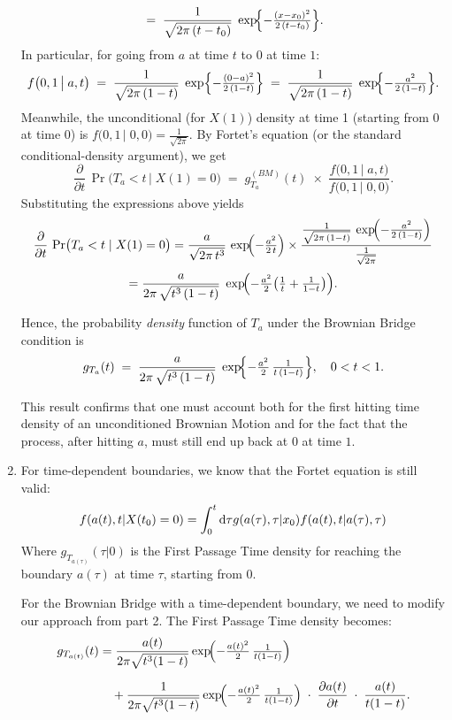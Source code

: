 \documentclass[12pt]{article}
\begin{document}
\begin{enumerate}
\[		\;=\;
		\frac{1}{\sqrt{2\pi\,(t-t_0)}} \;
		\exp\!\Bigl\{-\tfrac{(x - x_0)^{2}}{2\,(t-t_0)}\Bigr\}.
		\]
		In particular, for going from $a$ at time $t$ to $0$ at time $1$:
		\[
		f\bigl(0,1 \,\big|\; a,t\bigr)
		\;=\;
		\frac{1}{\sqrt{2\pi\,(1-t)}}\;
		\exp\Bigl\{-\tfrac{(0 - a)^2}{2\,(1-t)}\Bigr\}
		\;=\;
		\frac{1}{\sqrt{2\pi\,(1-t)}}\;
		\exp\!\Bigl\{-\tfrac{a^{2}}{2\,(1-t)}\Bigr\}.
		\]
		Meanwhile, the unconditional (for $X(1)$) density at time 1 (starting from 0 at time 0) is $f\bigl(0,1 \,\big|\; 0,0\bigr) = \tfrac{1}{\sqrt{2\pi}}$.
		By Fortet’s equation (or the standard conditional-density argument), we get
		\[
		\frac{\partial}{\partial t}\,\Pr\!\bigl(T_a < t \,\big|\; X(1)=0\bigr)
		\;=\;
		g_{T_a}^{(BM)}(t)
		\;\times\;
		\frac{f\bigl(0,1 \,\big|\; a,t\bigr)}{f\bigl(0,1 \,\big|\; 0,0\bigr)}.
		\]
		Substituting the expressions above yields
		\[
		\frac{\partial}{\partial t}\,\Pr\bigl(T_a < t \mid X(1)=0\bigr)
		= \frac{a}{\sqrt{2\pi\,t^{3}}}\,\exp\!\Bigl(-\tfrac{a^{2}}{2\,t}\Bigr)
		\times \frac{\tfrac{1}{\sqrt{2\pi\,(1-t)}}\,\exp\!\Bigl(-\tfrac{a^{2}}{2\,(1-t)}\Bigr)}
		{\tfrac{1}{\sqrt{2\pi}}}
		\]
		\[
		= \frac{a}{2\pi\,\sqrt{t^{3}\,(1-t)}}\;
		\exp\!\Bigl(-\tfrac{a^{2}}{2}\bigl(\tfrac{1}{t}+\tfrac{1}{1-t}\bigr)\Bigr).
		\]
		
		Hence, the probability \textit{density} function of $T_a$ under the Brownian Bridge condition is
		\[
		g_{T_a}(t)
		\;=\;
		\frac{a}{2\pi\,\sqrt{t^{3}\,(1-t)}}\;
		\exp\!\Bigl\{-\tfrac{a^{2}}{2}\,\tfrac{1}{t\,(1-t)}\Bigr\},
		\quad 0 < t < 1.
		\]
		
		\noindent
		This result confirms that one must account both for the first hitting time density of an unconditioned Brownian Motion and for the fact that the process, after hitting $a$, must still end up back at $0$ at time $1$.
		
		\item For time-dependent boundaries, we know that the Fortet equation is still valid:
		\begin{equation*}
			f(a(t),t|X(t_{0})=0)=\int_{0}^{t}\mathop{}\!\mathrm{d}\tau g(a(\tau),\tau|x_{0})f(a(t),t|a(\tau),\tau)
		\end{equation*}
		Where $g_{T_{a(\tau)}}(\tau|0)$ is the First Passage Time density for reaching the boundary $a(\tau)$ at time $\tau$, starting from 0.
		
		For the Brownian Bridge with a time-dependent boundary, we need to modify our approach from part 2. The First Passage Time density becomes:
		\begin{equation*}
			\begin{aligned}
				g_{T_{a(t)}}(t) 
				&= \frac{a(t)}{2\pi\sqrt{t^3(1-t)}} 
				\exp\!\Bigl(-\tfrac{a(t)^2}{2}\,\tfrac{1}{t(1-t)}\Bigr) \\[6pt]
				&\quad + \frac{1}{2\pi\sqrt{t^3(1-t)}} 
				\exp\!\Bigl(-\tfrac{a(t)^2}{2}\,\tfrac{1}{t(1-t)}\Bigr)
				\;\cdot\; \frac{\partial a(t)}{\partial t} 
				\;\cdot\; \frac{a(t)}{t(1-t)}.
			\end{aligned}
		\end{equation*}
		

\end{enumerate}
\end{document}
